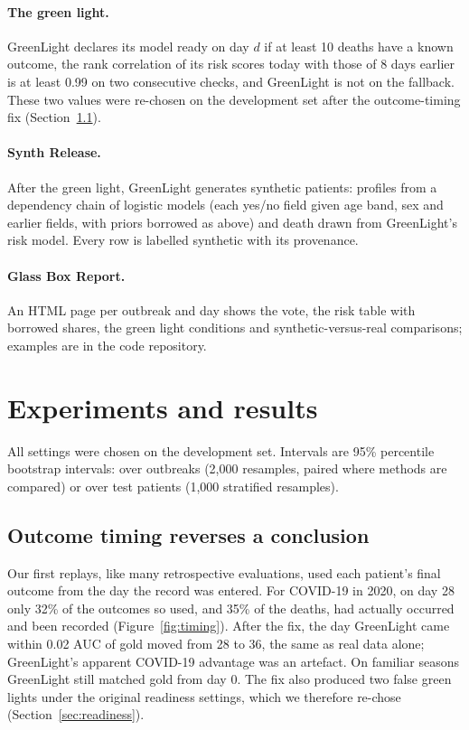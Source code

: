 \documentclass[10pt]{article}
\begin{document}
\paragraph{The green light.} GreenLight declares its model ready on day $d$ if at least 10 deaths have a known outcome, the rank
correlation of its risk scores today with those of 8 days earlier is at least 0.99 on two consecutive checks, and GreenLight
is not on the fallback. These two values were re-chosen on the development set after the outcome-timing fix
(Section~\ref{sec:timing}).
\paragraph{Synth Release.} After the green light, GreenLight generates synthetic patients: profiles from a dependency chain
of logistic models (each yes/no field given age band, sex and earlier fields, with priors borrowed as above) and
death drawn from GreenLight's risk model. Every row is labelled synthetic with its provenance.
\paragraph{Glass Box Report.} An HTML page per outbreak and day shows the vote, the risk table with borrowed shares,
the green light conditions and synthetic-versus-real comparisons; examples are in the code repository.

\section{Experiments and results}\label{sec:results}
All settings were chosen on the development set. Intervals are 95\% percentile bootstrap intervals: over outbreaks
(2,000 resamples, paired where methods are compared) or over test patients (1,000 stratified resamples).

\subsection{Outcome timing reverses a conclusion}\label{sec:timing}
Our first replays, like many retrospective evaluations, used each patient's final outcome from the day the record
was entered. For COVID-19 in 2020, on day 28 only 32\% of the outcomes so used, and 35\% of the deaths, had actually
occurred and been recorded (Figure~\ref{fig:timing}). After the fix, the day GreenLight came within 0.02 AUC of gold moved
from 28 to 36, the same as real data alone; GreenLight's apparent COVID-19 advantage was an artefact. On familiar seasons GreenLight
still matched gold from day 0. The fix also produced two false green lights under the original readiness settings,
which we therefore re-chose (Section~\ref{sec:readiness}).
\end{document}

